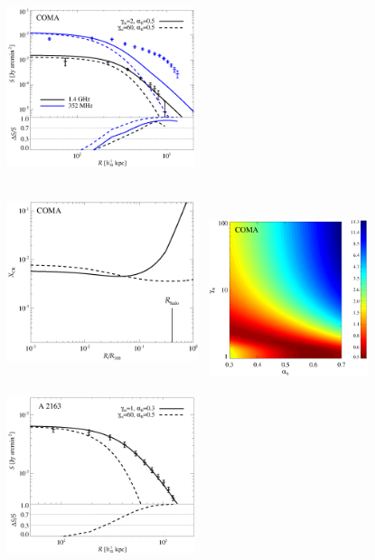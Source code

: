 \documentclass[useAMS,usenatbib]{mn2e}
\def\del#1{{}}
\begin{document}
\del{$M_{200}$ and $R_{200}$ are taken from \cite{2002ApJ...567..716R}. }

\begin{figure}
\centering
%
\includegraphics[width=5.5cm,height=5.5cm,keepaspectratio]{figures/SB_Coma.eps}
\includegraphics[width=5.6cm,height=5.6cm,keepaspectratio]{figures/XCR_Coma.eps}
\includegraphics[width=5cm,height=4.6cm]{figures/ProbComa.eps}
\includegraphics[width=5.5cm,height=5.5cm,keepaspectratio]{figures/SB_A2163.eps}

\end{figure}
\end{document}
